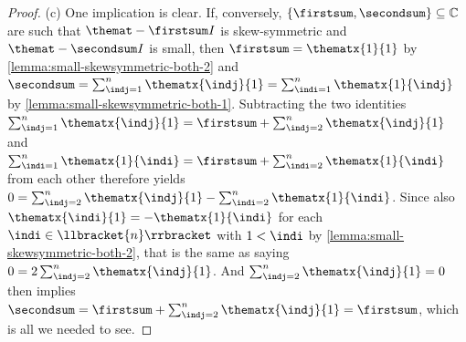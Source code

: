 \documentclass[10pt,a4paper]{amsart}
\numberwithin{equation}{section}
\newcommand{\identitymatrix}{I}
\newcommand{\comps}{\mathbb{C}}
\newcommand{\dwi}[1]{\llbracket{#1}\rrbracket}
\newcommand{\thedim}{n}
\begin{document}
{\begin{proof}
    (c)
    One implication is clear. If, conversely, $\{\firstsum,\secondsum\}\subseteq\comps$ are such that $\themat-\firstsum\identitymatrix$ is skew-symmetric and $\themat-\secondsum\identitymatrix$ is small, then $\firstsum=\thematx{1}{1}$ by \ref{lemma:small-skewsymmetric-both-2} and $\secondsum=\sum_{\indj=1}^\thedim\thematx{\indj}{1}=\sum_{\indi=1}^\thedim\thematx{1}{\indj}$ by \ref{lemma:small-skewsymmetric-both-1}. Subtracting the two identities $\sum_{\indj=1}^\thedim\thematx{\indj}{1}=\firstsum+\sum_{\indj=2}^\thedim\thematx{\indj}{1}$ and $\sum_{\indi=1}^\thedim\thematx{1}{\indi}=\firstsum+\sum_{\indi=2}^\thedim\thematx{1}{\indi}$ from each other therefore yields $0=\sum_{\indj=2}^\thedim\thematx{\indj}{1}-\sum_{\indi=2}^\thedim\thematx{1}{\indi}$. Since also  $\thematx{\indi}{1}=-\thematx{1}{\indi}$ for each $\indi\in\dwi{\thedim}$ with $1<\indi$ by \ref{lemma:small-skewsymmetric-both-2}, that is the same as saying $0=2\sum_{\indj=2}^\thedim\thematx{\indj}{1}$. And $\sum_{\indj=2}^\thedim\thematx{\indj}{1}=0$ then implies $\secondsum=\firstsum+\sum_{\indj=2}^\thedim\thematx{\indj}{1}=\firstsum$, which is all we needed to see.
\end{proof}
}
\end{document}
